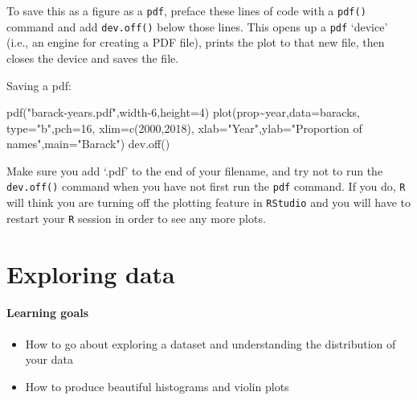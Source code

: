 \documentclass[
]{book}
\newenvironment{Shaded}{\begin{snugshade}}{\end{snugshade}}
\newcommand{\AttributeTok}[1]{\textcolor[rgb]{0.77,0.63,0.00}{#1}}
\newcommand{\DecValTok}[1]{\textcolor[rgb]{0.00,0.00,0.81}{#1}}
\newcommand{\FunctionTok}[1]{\textcolor[rgb]{0.00,0.00,0.00}{#1}}
\newcommand{\NormalTok}[1]{#1}
\newcommand{\SpecialCharTok}[1]{\textcolor[rgb]{0.00,0.00,0.00}{#1}}
\newcommand{\StringTok}[1]{\textcolor[rgb]{0.31,0.60,0.02}{#1}}
\providecommand{\tightlist}{%
  \setlength{\itemsep}{0pt}\setlength{\parskip}{0pt}}
\begin{document}
To save this as a figure as a \texttt{pdf}, preface these lines of code with a \texttt{pdf()} command and add \texttt{dev.off()} below those lines. This opens up a \texttt{pdf} `device' (i.e., an engine for creating a PDF file), prints the plot to that new file, then closes the device and saves the file.

Saving a pdf:

\begin{Shaded}
\begin{Highlighting}[]
\FunctionTok{pdf}\NormalTok{(}\StringTok{"barack{-}years.pdf"}\NormalTok{,width}\DecValTok{{-}6}\NormalTok{,}\AttributeTok{height=}\DecValTok{4}\NormalTok{)}
\FunctionTok{plot}\NormalTok{(prop}\SpecialCharTok{\textasciitilde{}}\NormalTok{year,}\AttributeTok{data=}\NormalTok{baracks,}
     \AttributeTok{type=}\StringTok{"b"}\NormalTok{,}\AttributeTok{pch=}\DecValTok{16}\NormalTok{,}
     \AttributeTok{xlim=}\FunctionTok{c}\NormalTok{(}\DecValTok{2000}\NormalTok{,}\DecValTok{2018}\NormalTok{),}
     \AttributeTok{xlab=}\StringTok{"Year"}\NormalTok{,}\AttributeTok{ylab=}\StringTok{"Proportion of names"}\NormalTok{,}\AttributeTok{main=}\StringTok{"Barack"}\NormalTok{)}
\FunctionTok{dev.off}\NormalTok{()}
\end{Highlighting}
\end{Shaded}

Make sure you add `.pdf' to the end of your filename, and try not to run the \texttt{dev.off()} command when you have not first run the \texttt{pdf} command. If you do, \texttt{R} will think you are turning off the plotting feature in \texttt{RStudio} and you will have to restart your \texttt{R} session in order to see any more plots.

\hypertarget{exploring-data}{%
\chapter{Exploring data}\label{exploring-data}}

\hypertarget{learning-goals-12}{%
\subsubsection*{Learning goals}\label{learning-goals-12}}

\begin{itemize}
\tightlist
\item
  How to go about exploring a dataset and understanding the distribution of your data\\
\item
  How to produce beautiful histograms and violin plots
\end{itemize}
\end{document}

